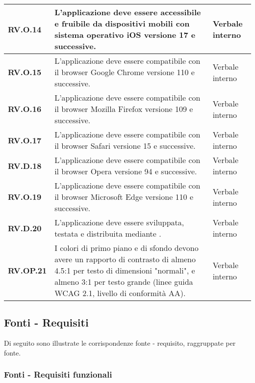 \begin{adjustwidth}{-0.5cm}{-0.5cm}
\begin{longtable}{|P{3cm}|P{6,5cm}|>{\arraybackslash}P{4cm}|}
    \hline
    \textbf{RV.O.14} & L'applicazione deve essere accessibile e fruibile da dispositivi mobili con sistema operativo iOS versione 17 e successive. & Verbale interno \\
    \hline
    \textbf{RV.O.15} & L'applicazione deve essere compatibile con il browser Google Chrome versione 110 e successive. & Verbale interno \\
    \hline
    \textbf{RV.O.16} & L'applicazione deve essere compatibile con il browser Mozilla Firefox versione 109 e successive. & Verbale interno \\
    \hline
    \textbf{RV.O.17} & L'applicazione deve essere compatibile con il browser Safari versione 15 e successive. & Verbale interno \\
    \hline
    \textbf{RV.D.18} & L'applicazione deve essere compatibile con il browser Opera versione 94 e successive. & Verbale interno \\
    \hline
    \textbf{RV.O.19} & L'applicazione deve essere compatibile con il browser Microsoft Edge versione 110 e successive. & Verbale interno \\
    \hline
    \textbf{RV.D.20} & L'applicazione deve essere sviluppata, testata e distribuita mediante . & Verbale interno \\
    \hline
    \textbf{RV.OP.21} & I colori di primo piano e di sfondo devono avere un rapporto di contrasto di almeno 4.5:1 per testo di dimensioni "normali", e almeno 3:1 per testo grande (linee guida WCAG 2.1, livello di conformità AA). & Verbale interno \\
  \end{longtable}
\end{adjustwidth}
\egroup

\subsection{Fonti - Requisiti}
Di seguito sono illustrate le corrispondenze fonte - requisito, raggruppate per fonte.

\subsubsection{Fonti - Requisiti funzionali}

